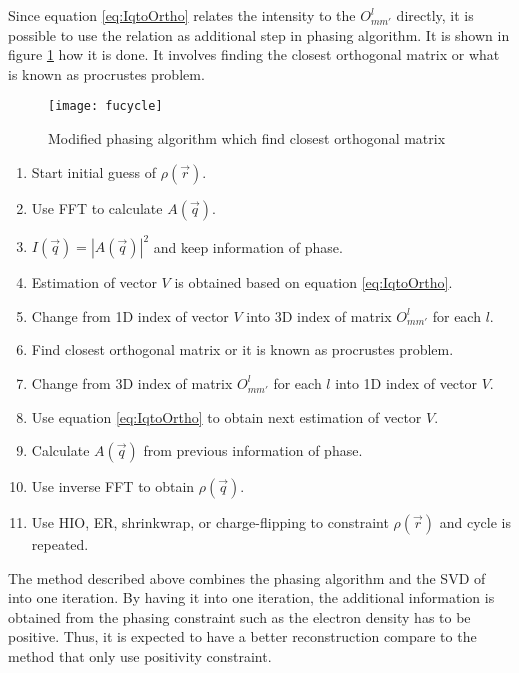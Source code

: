 Since equation \ref{eq:IqtoOrtho} relates the intensity to the $O^{l}_{mm'}$ directly, it is possible to use the relation as additional step in phasing algorithm. It is shown in figure \ref{fig:phasmo} how it is done. It involves finding the closest orthogonal matrix or what is known as procrustes problem.   
\begin{figure}[h!]
  \centering
  \texttt{[image: fucycle]}
\caption{Modified phasing algorithm which find closest orthogonal matrix}
\label{fig:phasmo}
\end{figure}
\begin{enumerate}
  \item Start initial guess of $\rho(\vec{r})$. 
  \item Use FFT to calculate $A(\vec{q})$. 
  \item $I(\vec{q})=|A(\vec{q})|^{2}$ and keep information of phase. 
  \item Estimation of vector $V$ is obtained based on equation \ref{eq:IqtoOrtho}. 
  \item Change from 1D index of vector $V$ into 3D index of matrix $O^{l}_{mm'}$ for each $l$. 
  \item Find closest orthogonal matrix or it is known as procrustes problem. 
  \item Change from 3D index of matrix $O^{l}_{mm'}$ for each $l$ into 1D index of vector $V$.
  \item Use equation \ref{eq:IqtoOrtho} to obtain next estimation of vector $V$.
  \item Calculate $A(\vec{q})$ from previous information of phase. 
  \item Use inverse FFT to obtain $\rho(\vec{q})$. 
  \item Use HIO, ER, shrinkwrap, or charge-flipping to constraint $\rho(\vec{r})$ and cycle is repeated.
\end{enumerate}

The method described above combines the phasing algorithm and the SVD of \Blq into one iteration. By having it into one iteration, the additional information is obtained from the phasing constraint such as the electron density has to be positive. Thus, it is expected to have a better reconstruction compare to the method that only use positivity constraint.  
